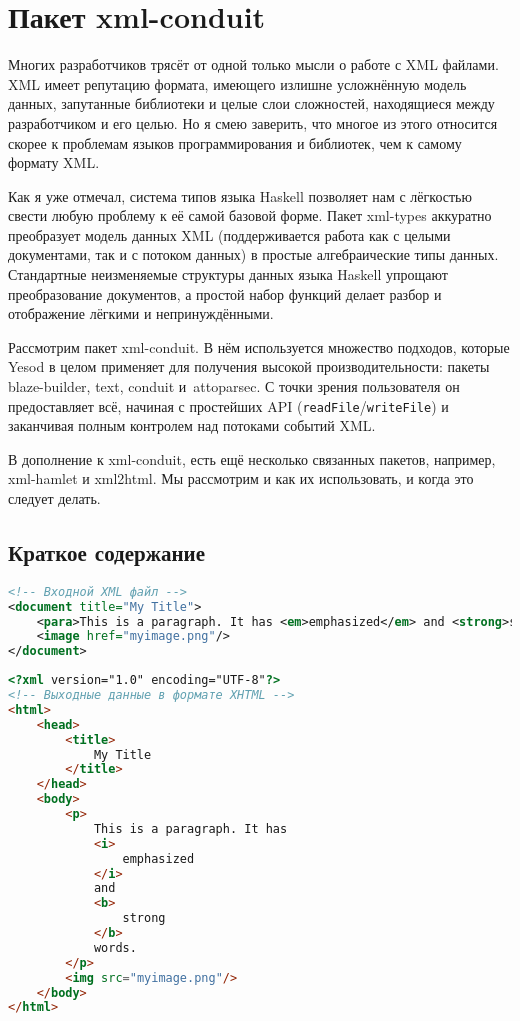 \chapter{Пакет xml-conduit}

Многих разработчиков трясёт от одной только мысли о работе с XML файлами. XML
имеет репутацию формата, имеющего излишне усложнённую модель данных, запутанные
библиотеки и целые слои сложностей, находящиеся между разработчиком и его
целью. Но я смею заверить, что многое из этого относится скорее к проблемам
языков программирования и библиотек, чем к самому формату XML.

Как я уже отмечал, система типов языка Haskell позволяет нам с лёгкостью свести
любую проблему к её самой базовой форме. Пакет
xml-types
аккуратно преобразует модель данных XML (поддерживается работа как с целыми
документами, так и с потоком данных) в простые алгебраические типы данных.
Стандартные неизменяемые структуры данных языка Haskell упрощают преобразование
документов, а простой набор функций делает разбор и отображение лёгкими и
непринуждёнными.

Рассмотрим пакет xml-conduit. В нём используется множество подходов, которые
Yesod в целом применяет для получения высокой производительности: пакеты
blaze-builder, text, conduit и~attoparsec. С точки зрения пользователя он
предоставляет всё, начиная с простейших API
(\lstinline!readFile!/\lstinline!writeFile!) и заканчивая полным контролем над
потоками событий XML.

В дополнение к xml-conduit, есть ещё несколько связанных пакетов, например,
xml-hamlet и xml2html. Мы рассмотрим и как их использовать, и когда это следует
делать.

\section{Краткое содержание} %
\begin{lstlisting}[language=XML, caption={}]
<!-- Входной XML файл -->
<document title="My Title">
    <para>This is a paragraph. It has <em>emphasized</em> and <strong>strong</strong> words.</para>
    <image href="myimage.png"/>
</document>
\end{lstlisting}


\begin{lstlisting}[language=HTML, caption={}]
<?xml version="1.0" encoding="UTF-8"?>
<!-- Выходные данные в формате XHTML -->
<html>
    <head>
        <title>
            My Title
        </title>
    </head>
    <body>
        <p>
            This is a paragraph. It has
            <i>
                emphasized
            </i>
            and
            <b>
                strong
            </b>
            words.
        </p>
        <img src="myimage.png"/>
    </body>
</html>
\end{lstlisting}

